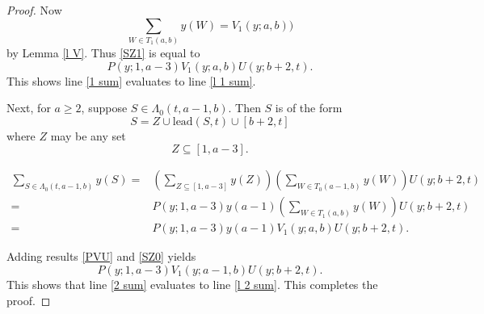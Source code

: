 \documentclass[10pt,a4paper]{amsart}
\begin{document}
\begin{proof}
Now
\[
\sum_{W \in T_1(a,b)} y(W) = V_1(y; a,b))
\]
by Lemma \ref{l V}. 
Thus \eqref{SZ1} is equal to 
\begin{equation} \label{PVU}
P(y; 1,a-3)V_1(y; a,b)U(y; b+2,t).
\end{equation}
This shows line \eqref{1 sum} evaluates to line \eqref{l 1 sum}. 

Next, for $a \geq 2$, suppose $S \in \Lambda_0(t,a-1,b)$. Then $S$ is of the form 
\[
S =  Z \cup \mathrm{lead}(S,t) \cup [b+2,t]
\]
where $Z$ may be any set 
\[
Z \subseteq [1,a-3].
\]

\begin{align} 
\sum_{S \in \Lambda_0(t,a-1,b)} y(S) =& \left (\sum_{Z \subseteq [1,a-3]} y(Z) \right ) \left (\sum_{W \in T_0(a-1,b)} y(W) \right ) U(y; b+2, t) \nonumber  \\
=& P(y; 1,a-3)y(a-1)\left(\sum_{W \in T_1(a,b)} y(W) \right)U(y; b+2, t)  \nonumber \\ 
= & P(y; 1,a-3)y(a-1)V_1(y; a,b)U(y; b+2,t).\label{SZ0}
\end{align}

Adding results \eqref{PVU} and \eqref{SZ0} yields 
\[
P(y; 1,a-3)V_1(y; a-1,b)U(y; b+2,t).
\]
This shows that line \eqref{2 sum} evaluates to line \eqref{l 2 sum}. This completes the proof. 
\end{proof}
\end{document}
